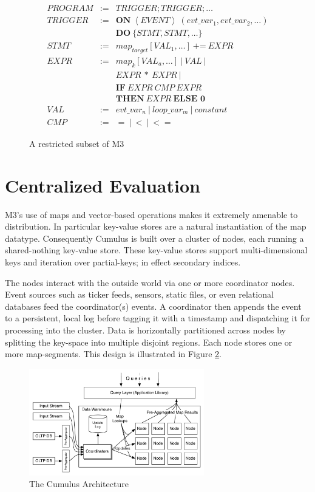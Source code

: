 \documentclass{vldb}
\begin{document}
\begin{figure}
\begin{center}
{\small
\begin{eqnarray*}
PROGRAM & := & TRIGGER; TRIGGER; \ldots\\
TRIGGER & := & \textbf{ON}\ \left <EVENT\right>\ ( evt\_var_1, evt\_var_2, \ldots )\\ & & \textbf{DO}\ \{ STMT, STMT, \ldots\}\\
STMT & := & map_{target}[VAL_{1}, \ldots]\ \textbf{+=}\ EXPR\\
EXPR & := & map_{k}[VAL_{a}, \ldots]\ |\ VAL\ |\\&& EXPR\ *\ EXPR\ |\\&& \textbf{IF}\ EXPR\ CMP\ EXPR\\&& \textbf{THEN}\ EXPR\ \textbf{ELSE 0}\\
VAL & := & evt\_var_{n}\ |\ loop\_var_{m}\ |\ constant\\
CMP & := & =\ |\ <\ |\ <=
\end{eqnarray*}}
\caption{A restricted subset of M3}
\label{fig:m3_defn}
\end{center}
\end{figure}



\section{Centralized Evaluation}

M3's use of maps and vector-based operations makes it extremely amenable to distribution.  In particular key-value stores are a natural instantiation of the map datatype.  Consequently Cumulus is built over a cluster of nodes, each running a shared-nothing key-value store.  These key-value stores support multi-dimensional keys and iteration over partial-keys; in effect secondary indices.  

The nodes interact with the outside world via one or more coordinator nodes.  Event sources such as ticker feeds, sensors, static files, or even relational databases feed the coordinator(s) events.  A coordinator then appends the event to a persistent, local log before tagging it with a timestamp and dispatching it for processing into the cluster.  Data is horizontally partitioned across nodes by splitting the key-space into multiple disjoint regions.  Each node stores one or more map-segments.  This design is illustrated in Figure \ref{fig:architecture}.

\begin{figure}
\includegraphics[width=3in]{graphics/Architecture.pdf}
\caption{The Cumulus Architecture}
\label{fig:architecture}
\end{figure}
\end{document}
